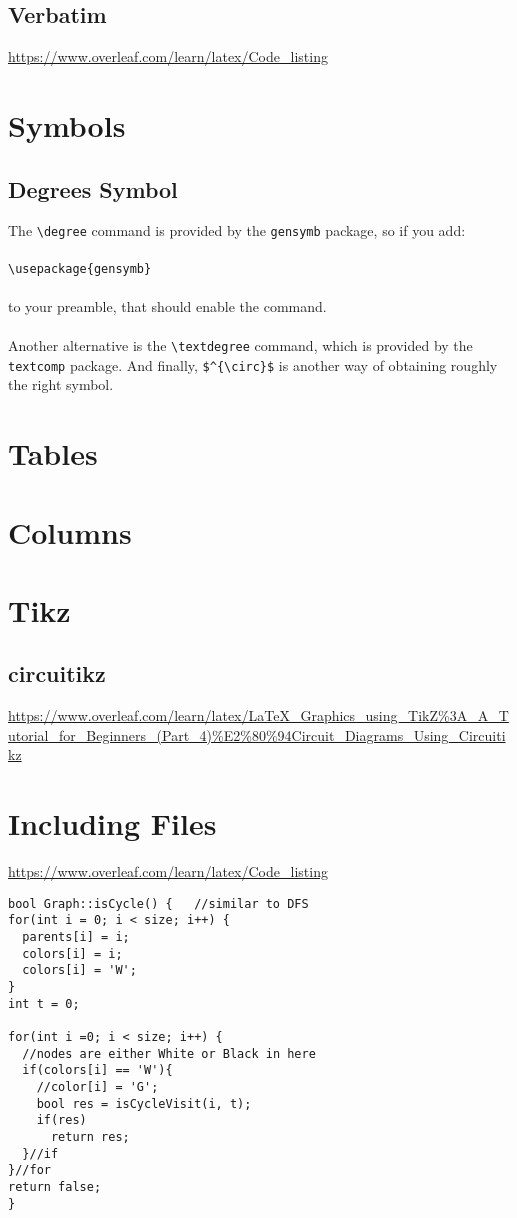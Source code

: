 \documentclass[10pt, letterpaper]{article}
\begin{document}
\subsection{Verbatim}
\url{https://www.overleaf.com/learn/latex/Code_listing}


\section{Symbols}
\subsection{Degrees Symbol}
The \verb|\degree| command is provided by the \verb|gensymb| package, so if you add:\\
\\
\verb|\usepackage{gensymb}|\\
\\
to your preamble, that should enable the command.\\
\\
Another alternative is the \verb|\textdegree| command, which is provided by the \verb|textcomp| package. And finally, \verb|$^{\circ}$| is another way of obtaining roughly the right symbol.


\section{Tables}


\section{Columns}


\section{Tikz}
\subsection{circuitikz}
\url{https://www.overleaf.com/learn/latex/LaTeX_Graphics_using_TikZ%3A_A_Tutorial_for_Beginners_(Part_4)%E2%80%94Circuit_Diagrams_Using_Circuitikz}


\section{Including Files}
\url{https://www.overleaf.com/learn/latex/Code_listing}
\lstset{style=basicstyle}
\begin{lstlisting}[title=Function: Graph::isCycle()]
bool Graph::isCycle() {   //similar to DFS
for(int i = 0; i < size; i++) {
  parents[i] = i;
  colors[i] = i;
  colors[i] = 'W';
}
int t = 0;

for(int i =0; i < size; i++) {
  //nodes are either White or Black in here
  if(colors[i] == 'W'){
    //color[i] = 'G';
    bool res = isCycleVisit(i, t);
    if(res)
      return res;
  }//if
}//for
return false;
}
\end{lstlisting}
\end{document}
